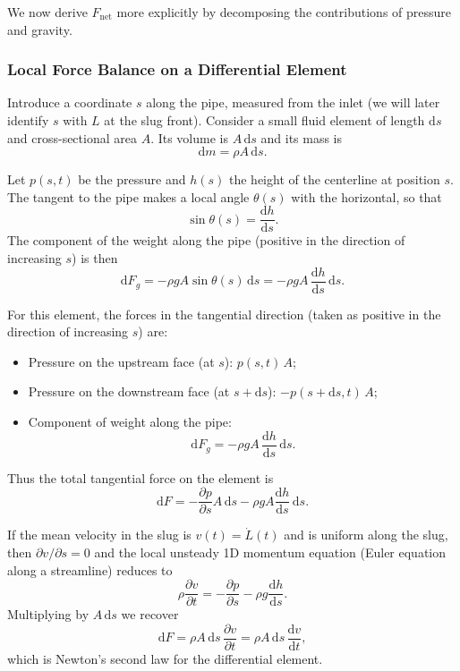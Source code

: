\documentclass[11pt]{article}
\begin{document}
We now derive $F_{\text{net}}$ more explicitly by decomposing the contributions
of pressure and gravity.

\subsubsection*{Local Force Balance on a Differential Element}

Introduce a coordinate $s$ along the pipe, measured from the inlet (we will
later identify $s$ with $L$ at the slug front). Consider a small fluid element
of length $\mathrm{d}s$ and cross-sectional area $A$. Its volume is
$A\,\mathrm{d}s$ and its mass is
\[
\mathrm{d}m = \rho A\,\mathrm{d}s.
\]

Let $p(s,t)$ be the pressure and $h(s)$ the height of the centerline at position
$s$. The tangent to the pipe makes a local angle $\theta(s)$ with the horizontal,
so that
\[
\sin\theta(s) = \frac{\mathrm{d}h}{\mathrm{d}s}.
\]
The component of the weight along the pipe (positive in the direction of
increasing $s$) is then
\[
\mathrm{d}F_g
  = -\rho g A \sin\theta(s)\,\mathrm{d}s
  = -\rho g A\,\frac{\mathrm{d}h}{\mathrm{d}s}\,\mathrm{d}s.
\]

For this element, the forces in the tangential direction (taken as positive in
the direction of increasing $s$) are:
\begin{itemize}
  \item Pressure on the upstream face (at $s$): $p(s,t)\,A$;
  \item Pressure on the downstream face (at $s + \mathrm{d}s$):
        $-p(s+\mathrm{d}s,t)\,A$;
  \item Component of weight along the pipe:
        \[
        \mathrm{d}F_g
        = -\rho g A\,\frac{\mathrm{d}h}{\mathrm{d}s}\,\mathrm{d}s.
        \]
\end{itemize}
Thus the total tangential force on the element is
\[
\mathrm{d}F
= -\frac{\partial p}{\partial s} A\,\mathrm{d}s
  - \rho g A \frac{\mathrm{d}h}{\mathrm{d}s}\,\mathrm{d}s.
\]

If the mean velocity in the slug is $v(t) = \dot L(t)$ and is uniform along the
slug, then $\partial v/\partial s = 0$ and the local unsteady 1D momentum
equation (Euler equation along a streamline) \cite{white_fm} reduces to
\[
\rho \frac{\partial v}{\partial t}
  = -\frac{\partial p}{\partial s} - \rho g \frac{\mathrm{d}h}{\mathrm{d}s}.
\]
Multiplying by $A\,\mathrm{d}s$ we recover
\[
\mathrm{d}F = \rho A\,\mathrm{d}s \,\frac{\partial v}{\partial t}
           = \rho A\,\mathrm{d}s \,\frac{\mathrm{d}v}{\mathrm{d}t},
\]
which is Newton's second law for the differential element.
\end{document}
